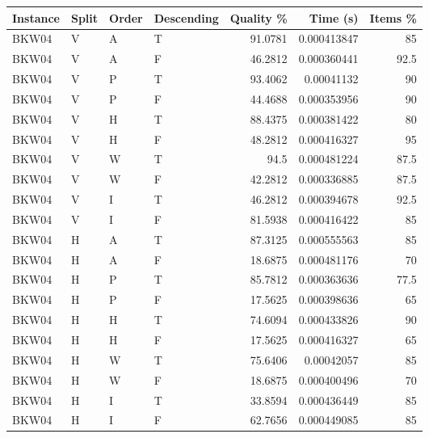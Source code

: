 \begin{tabular}{llllrrr}
    \hline
    Instance & Split & Order & Descending & Quality \% & Time (s)    & Items \% \\
    \hline
    BKW04    & V     & A     & T          & 91.0781    & 0.000413847 & 85       \\
    BKW04    & V     & A     & F          & 46.2812    & 0.000360441 & 92.5     \\
    BKW04    & V     & P     & T          & 93.4062    & 0.00041132  & 90       \\
    BKW04    & V     & P     & F          & 44.4688    & 0.000353956 & 90       \\
    BKW04    & V     & H     & T          & 88.4375    & 0.000381422 & 80       \\
    BKW04    & V     & H     & F          & 48.2812    & 0.000416327 & 95       \\
    BKW04    & V     & W     & T          & 94.5       & 0.000481224 & 87.5     \\
    BKW04    & V     & W     & F          & 42.2812    & 0.000336885 & 87.5     \\
    BKW04    & V     & I     & T          & 46.2812    & 0.000394678 & 92.5     \\
    BKW04    & V     & I     & F          & 81.5938    & 0.000416422 & 85       \\
    BKW04    & H     & A     & T          & 87.3125    & 0.000555563 & 85       \\
    BKW04    & H     & A     & F          & 18.6875    & 0.000481176 & 70       \\
    BKW04    & H     & P     & T          & 85.7812    & 0.000363636 & 77.5     \\
    BKW04    & H     & P     & F          & 17.5625    & 0.000398636 & 65       \\
    BKW04    & H     & H     & T          & 74.6094    & 0.000433826 & 90       \\
    BKW04    & H     & H     & F          & 17.5625    & 0.000416327 & 65       \\
    BKW04    & H     & W     & T          & 75.6406    & 0.00042057  & 85       \\
    BKW04    & H     & W     & F          & 18.6875    & 0.000400496 & 70       \\
    BKW04    & H     & I     & T          & 33.8594    & 0.000436449 & 85       \\
    BKW04    & H     & I     & F          & 62.7656    & 0.000449085 & 85       \\

\end{tabular}

